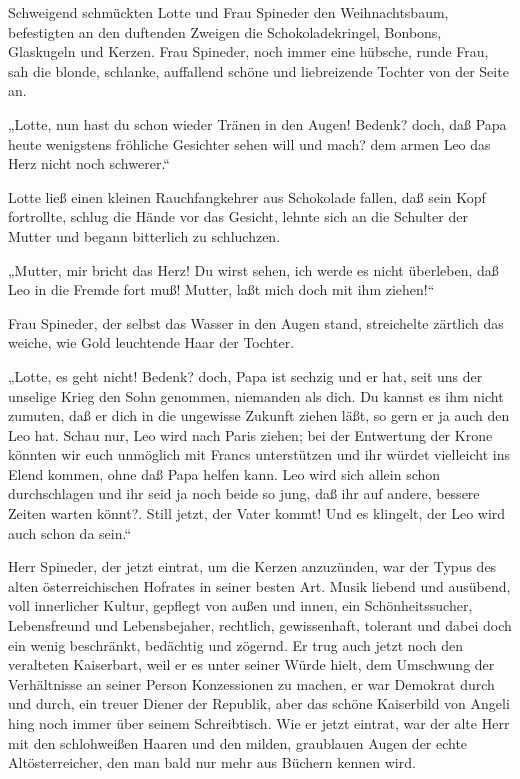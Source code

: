 Schweigend schmückten Lotte und Frau Spineder den Weihnachtsbaum,
befestigten an den duftenden Zweigen die Schokoladekringel,
Bonbons, Glaskugeln und Kerzen. Frau Spineder, noch immer eine
hübsche, runde Frau, sah die blonde, schlanke, auffallend schöne
und liebreizende Tochter von der Seite an.

„Lotte, nun hast du schon wieder Tränen in den Augen! Bedenk? doch,
daß Papa heute wenigstens fröhliche Gesichter sehen will und mach?
dem armen Leo das Herz nicht noch schwerer.“

Lotte ließ einen kleinen Rauchfangkehrer aus Schokolade fallen, daß
sein Kopf fortrollte, schlug die Hände vor das Gesicht, lehnte sich
an die Schulter der Mutter und begann bitterlich zu schluchzen.

„Mutter, mir bricht das Herz! Du wirst sehen, ich werde es nicht
überleben, daß Leo in die Fremde fort muß! Mutter, laßt mich doch
mit ihm ziehen!“

Frau Spineder, der selbst das Wasser in den Augen stand,
streichelte zärtlich das weiche, wie Gold leuchtende Haar der
Tochter.

„Lotte, es geht nicht! Bedenk? doch, Papa ist sechzig und er hat,
seit uns der unselige Krieg den Sohn genommen, niemanden als dich.
Du kannst es ihm nicht  zumuten, daß er dich in die
ungewisse Zukunft ziehen läßt, so gern er ja auch den Leo hat.
Schau nur, Leo wird nach Paris ziehen; bei der Entwertung der Krone
könnten wir euch unmöglich mit Francs unterstützen und ihr würdet
vielleicht ins Elend kommen, ohne daß Papa helfen kann. Leo wird
sich allein schon durchschlagen und ihr seid ja noch beide so jung,
daß ihr auf andere, bessere Zeiten warten könnt?. Still jetzt, der
Vater kommt! Und es klingelt, der Leo wird auch schon da sein.“

Herr Spineder, der jetzt eintrat, um die Kerzen anzuzünden, war der
Typus des alten österreichischen Hofrates in seiner besten Art.
Musik liebend und ausübend, voll innerlicher Kultur, gepflegt von
außen und innen, ein Schönheitssucher, Lebensfreund und
Lebensbejaher, rechtlich, gewissenhaft, tolerant und dabei doch ein
wenig beschränkt, bedächtig und zögernd. Er trug auch jetzt noch
den veralteten Kaiserbart, weil er es unter seiner Würde hielt, dem
Umschwung der Verhältnisse an seiner Person Konzessionen zu machen,
er war Demokrat durch und durch, ein treuer Diener der Republik,
aber das schöne Kaiserbild von Angeli hing noch immer über seinem
Schreibtisch. Wie er jetzt eintrat, war der alte Herr mit den
schlohweißen Haaren und den milden, graublauen Augen der echte
Altösterreicher, den man bald nur mehr aus Büchern kennen wird.

